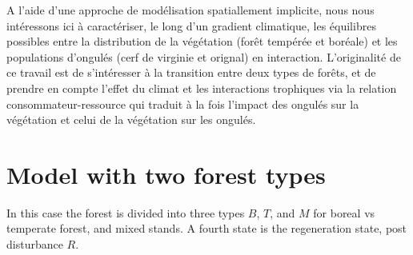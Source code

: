 \vspace{1em}

\noindent A l'aide d'une approche de modélisation spatiallement implicite, nous nous
intéressons ici à caractériser, le long d'un gradient climatique, les
équilibres possibles entre la distribution de la végétation (forêt tempérée et
boréale) et les populations d'ongulés (cerf de virginie et orignal) en
interaction. L'originalité de ce travail est de s'intéresser à la transition
entre deux types de forêts, et de prendre en compte l'effet du climat et les
interactions trophiques via la relation consommateur-ressource qui traduit à
la fois l'impact des ongulés sur la végétation et celui de la végétation sur
les ongulés.










\newpage
\section{Model with two forest types}

In this case the forest is divided into three types $B$, $T$, and $M$ for
boreal vs temperate forest, and mixed stands. A fourth state is the
regeneration state, post disturbance $R$.

